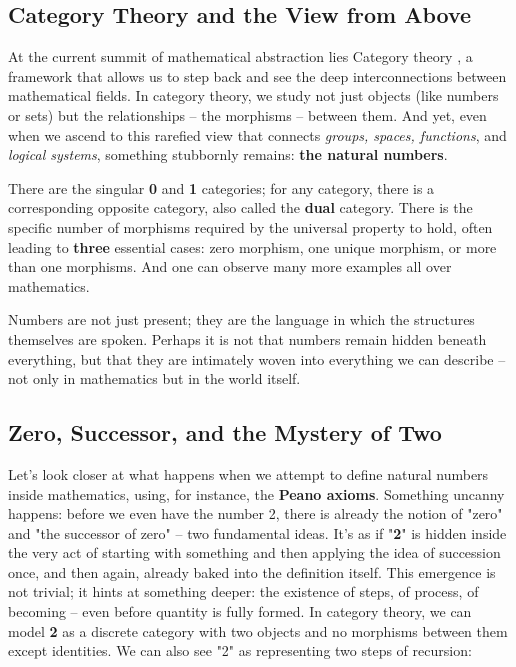 \documentclass{article}
\begin{document}
\subsection*{Category Theory and the View from Above}
At the current summit of mathematical abstraction lies Category theory \cite{category}, a framework that allows us to step back and see the deep interconnections between mathematical fields. In category theory, we study not just objects (like numbers or sets) but the relationships -- the morphisms -- between them. And yet, even when we ascend to this rarefied view that connects \textit{groups, spaces, functions}, and \textit{logical systems}, something stubbornly remains: \textbf{the natural numbers}.

There are the singular \textbf{0} and \textbf{1} categories; for any category, there is a corresponding opposite category, also called the \textbf{dual} category. There is the specific number of morphisms required by the universal property \cite{universal_property} to hold, often leading to \textbf{three} essential cases: zero morphism, one unique morphism, or more than one morphisms. And one can observe many more examples all over mathematics.

Numbers are not just present; they are the language in which the structures themselves are spoken. Perhaps it is not that numbers remain hidden beneath everything, but that they are intimately woven into everything we can describe -- not only in mathematics but in the world itself.

\subsection*{Zero, Successor, and the Mystery of Two}

Let's look closer at what happens when we attempt to define natural numbers inside mathematics, using, for instance, the \textbf{Peano axioms}. Something uncanny happens: before we even have the number 2, there is already the notion of "zero" and "the successor of zero" -- two fundamental ideas. It's as if "\textbf{2}" is hidden inside the very act of starting with something and then applying the idea of succession once, and then again, already baked into the definition itself. This emergence is not trivial; it hints at something deeper: the existence of steps, of process, of becoming -- even before quantity is fully formed. In category theory, we can model \textbf{2} as a discrete category \cite{discrete_category} with two objects and no morphisms between them except identities. We can also see "2" as representing two steps of recursion:
\end{document}
